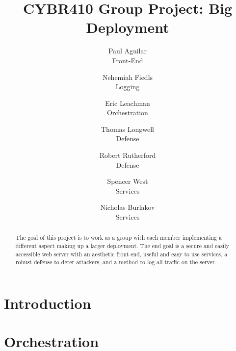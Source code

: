 \documentclass[letterpaper,twocolumn,10pt]{article}
\begin{document}

\date{}

\title{\Large \bf CYBR410 Group Project: Big Deployment}

\author{
  {\rm Paul Aguilar}\\
  Front-End
  \and
  {\rm Nehemiah Fiedls}\\
  Logging
  \and
  {\rm Eric Leachman}\\
  Orchestration
  \and
  {\rm Thomas Longwell}\\
  Defense
  \and
  {\rm Robert Rutherford}\\
  Defense
  \and
  {\rm Spencer West}\\
  Services
  \and
  {\rm Nicholas Burlakov}\\
  Services
}

\maketitle

\begin{abstract}
The goal of this project is to work as a group with each member implementing a different aspect making up a larger deployment. The end goal is a secure and easily accessible web server with an aesthetic front end, useful and easy to use services, a robust defense to deter attackers,  and a method to log all traffic on the server. 
\end{abstract}


\section{Introduction}


\section{Orchestration}

\end{document}
